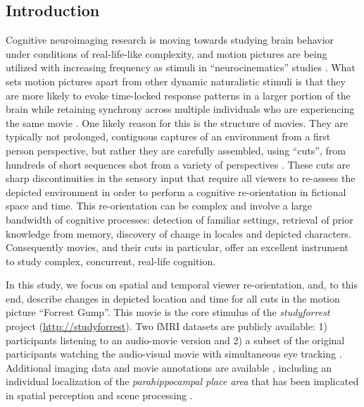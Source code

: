 \documentclass[10pt,a4paper]{article}
\begin{document}
\begin{multicols}{2}

\section*{Introduction}

Cognitive neuroimaging research is moving towards studying brain behavior under
conditions of real-life-like complexity, and motion pictures are being utilized
with increasing frequency as stimuli in ``neurocinematics'' studies
\citep{hasson_2008_neurocinematics}. What sets motion pictures apart from other
dynamic naturalistic stimuli is that they are more likely to evoke time-locked
response patterns in a larger portion of the brain while retaining synchrony
across multiple individuals who are experiencing the same movie
\citep{hasson_2009_natural_stim_review,lankinen_2014_MEG_during_movie}. One
likely reason for this is the structure of movies. They are typically not
prolonged, contiguous captures of an environment from a first person
perspective, but rather they are carefully assembled, using ``cuts'', from
hundreds of short sequences shot from a variety of perspectives
\citep{cutting_2011_changing_poetics_of_dissolve}. These cuts are sharp
discontinuities in the sensory input that require all viewers to re-assess the
depicted environment in order to perform a cognitive re-orientation in fictional
space and time. This re-orientation can be complex and involve a
large bandwidth of cognitive processes: detection of familiar settings,
retrieval of prior knowledge from memory, discovery of change in locales and
depicted characters. Consequently movies, and their cuts in particular, offer an
excellent instrument to study complex, concurrent, real-life cognition.

In this study, we focus on spatial and temporal viewer re-orientation, and, to
this end, describe changes in depicted location and time for all cuts in the
motion picture ``Forrest Gump''. This movie is the core stimulus of the
\textit{studyforrest} project (\url{http://studyforrest}). Two fMRI datasets
are publicly available: 1) participants listening to an audio-movie version
\citep{HBI+14} and 2) a subset of the original participants watching the
audio-visual movie with simultaneous eye tracking \citep{HAK+16}. Additional
imaging data and movie annotations are available \citep{HDH+2015,LRS+2015},
including an individual localization of the \textit{parahippocampal place area}
\citep{SKG+16} that has been implicated in spatial perception and scene
processing \citep{EK1998}.


\end{multicols}
\end{document}
